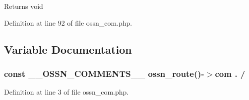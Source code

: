 \begin{DoxyReturn}{Returns}
void 
\end{DoxyReturn}


Definition at line 92 of file ossn\+\_\+com.\+php.



\subsection{Variable Documentation}
\subsubsection[{\texorpdfstring{\+\_\+\+\_\+\+O\+S\+S\+N\+\_\+\+C\+O\+M\+M\+E\+N\+T\+S\+\_\+\+\_\+}{__OSSN_COMMENTS__}}]{\setlength{\rightskip}{0pt plus 5cm}const \+\_\+\+\_\+\+O\+S\+S\+N\+\_\+\+C\+O\+M\+M\+E\+N\+T\+S\+\_\+\+\_\+ {\bf ossn\+\_\+route}()-\/$>$com . /\textquotesingle{}}\hypertarget{_ossn_comments_2ossn__com_8php_a83c04e7e889b12937f6fd4ccb7730a0a}{}\label{_ossn_comments_2ossn__com_8php_a83c04e7e889b12937f6fd4ccb7730a0a}


Definition at line 3 of file ossn\+\_\+com.\+php.

